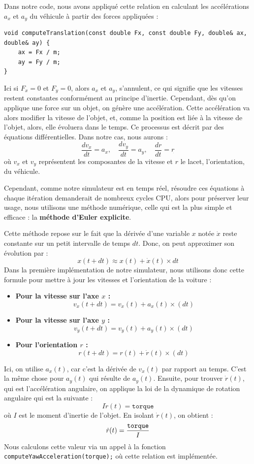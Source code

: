 \documentclass[a4paper,12pt]{report}
\begin{document}
    Dans notre code, nous avons appliqué cette relation en calculant les accélérations $a_x$ et $a_y$ du véhicule à partir des forces appliquées :


    \begin{lstlisting}[style=CStyle]
void computeTranslation(const double Fx, const double Fy, double& ax, double& ay) {
    ax = Fx / m;
    ay = Fy / m;
}

    \end{lstlisting}

    Ici si $F_x = 0$ et $F_y = 0$, alors $a_x$ et $a_y$, s'annulent, ce qui signifie que les vitesses restent constantes conformément au principe d'inertie.
    Cependant, dès qu'on applique une force sur un objet, on génère une accélération. Cette accélération va alors modifier la vitesse de l'objet, et, comme la position est liée à la vitesse de l'objet, alors, elle évoluera dans le temps. Ce processus est décrit par des équations différentielles. Dans notre cas, nous aurons :
    $$\frac{d v_x}{dt} = a_x, \quad \frac{d v_y}{dt} = a_y, \quad \frac{d r}{dt} = r_{\dot{}}$$
    où $v_x$ et $v_y$ représentent les composantes de la vitesse et $r$ le lacet, l'orientation, du véhicule.

    Cependant, comme notre simulateur est en temps réel, résoudre ces équations à chaque itération demanderait de nombreux cycles CPU, alors pour préserver leur usage, nous utilisons une méthode numérique, celle qui est la plus simple et efficace : la \textbf{méthode d'Euler explicite}.

    Cette méthode repose sur le fait que la dérivée d'une variable $x$ notée $\dot{x}$ reste constante sur un petit intervalle de temps $dt$. Donc, on peut approximer son évolution par :
    $$x(t+dt) \approx x(t) + \dot{x}(t) \times dt$$
    Dans la première implémentation de notre simulateur, nous utilisons donc cette formule pour mettre à jour les vitesses et l'orientation de la voiture :
    \\
    \begin{itemize}
        \item \textbf{Pour la vitesse sur l'axe $x$ :}
        $$v_x(t+dt) = v_x(t)+a_x(t)\times(dt)$$
        \item \textbf{Pour la vitesse sur l'axe $y$ :}
        $$v_y(t+dt) = v_y(t)+a_y(t)\times(dt)$$
        \item \textbf{Pour l'orientation $r$ :}
        $$r(t+dt) = r(t)+\dot{r}(t)\times(dt)$$
    \end{itemize}
    Ici, on utilise $a_x(t)$, car c'est la dérivée de $v_x(t)$ par rapport au temps. C'est la même chose pour $a_y(t)$ qui résulte de $a_y(t)$. Ensuite, pour trouver $\dot{r}(t)$, qui est l'accélération angulaire, on applique la loi de la dynamique de rotation angulaire qui est la suivante :
    $$I\dot{r}(t) = \texttt{torque}$$
    où $I$ est le moment d'inertie de l'objet. En isolant $\dot{r}(t)$, on obtient :
    $$\dot{r}(t)= {\texttt{torque}\over{I}}$$
    Nous calculons cette valeur via un appel à la fonction \texttt{computeYawAcceleration(torque);} où cette relation est implémentée.
\end{document}
